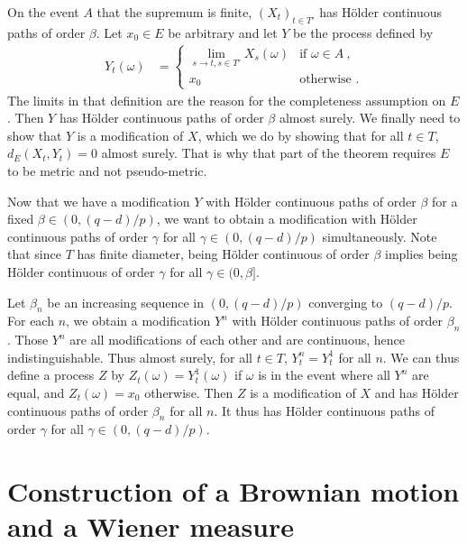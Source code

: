 \documentclass[lean]{Draft}
\begin{document}
On the event $A$ that the supremum is finite, $(X_t)_{t \in T'}$ has Hölder continuous paths of order $\beta$.
Let $x_0 \in E$ be arbitrary and let $Y$ be the process defined by
\begin{align*}
  Y_t(\omega)
  &= \begin{cases}
    \lim_{s \to t, s \in T'} X_s(\omega) & \text{if } \omega \in A \: , \\
    x_0 & \text{otherwise .}
  \end{cases}
\end{align*}
The limits in that definition are the reason for the completeness assumption on $E$.
Then $Y$ has Hölder continuous paths of order $\beta$ almost surely.
We finally need to show that $Y$ is a modification of $X$, which we do by showing that for all $t \in T$, $d_E(X_t, Y_t) = 0$ almost surely.
That is why that part of the theorem requires $E$ to be metric and not pseudo-metric.


Now that we have a modification $Y$ with Hölder continuous paths of order $\beta$ for a fixed $\beta \in (0, (q - d)/p)$, we want to obtain a modification with Hölder continuous paths of order $\gamma$ for all $\gamma \in (0, (q - d)/p)$ simultaneously.
Note that since $T$ has finite diameter, being Hölder continuous of order $\beta$ implies being Hölder continuous of order $\gamma$ for all $\gamma \in (0, \beta]$.

Let $\beta_n$ be an increasing sequence in $(0, (q - d)/p)$ converging to $(q - d)/p$.
For each $n$, we obtain a modification $Y^n$ with Hölder continuous paths of order $\beta_n$.
Those $Y^n$ are all modifications of each other and are continuous, hence indistinguishable.
Thus almost surely, for all $t \in T$, $Y^n_t = Y^1_t$ for all $n$.
We can thus define a process $Z$ by $Z_t(\omega) = Y^1_t(\omega)$ if $\omega$ is in the event where all $Y^n$ are equal, and $Z_t(\omega) = x_0$ otherwise.
Then $Z$ is a modification of $X$ and has Hölder continuous paths of order $\beta_n$ for all $n$.
It thus has Hölder continuous paths of order $\gamma$ for all $\gamma \in (0, (q - d)/p)$.

\section{Construction of a Brownian motion and a Wiener measure}
\label{S:BM}
\end{document}
